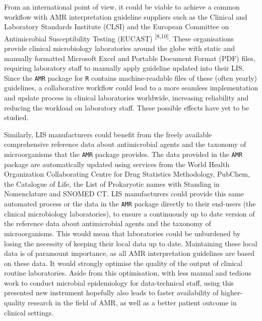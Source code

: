 \documentclass[
]{book}
\begin{document}
From an international point of view, it could be viable to achieve a common workflow with AMR interpretation guideline suppliers such as the Clinical and Laboratory Standards Institute (CLSI) and the European Committee on Antimicrobial Susceptibility Testing (EUCAST) \textsuperscript{{[}8,10{]}}. These organisations provide clinical microbiology laboratories around the globe with static and manually formatted Microsoft Excel and Portable Document Format (PDF) files, requiring laboratory staff to manually apply guideline updated into their LIS. Since the \texttt{AMR} package for \texttt{R} contains machine-readable files of these (often yearly) guidelines, a collaborative workflow could lead to a more seamless implementation and update process in clinical laboratories worldwide, increasing reliability and reducing the workload on laboratory staff. These possible effects have yet to be studied.

Similarly, LIS manufacturers could benefit from the freely available comprehensive reference data about antimicrobial agents and the taxonomy of microorganisms that the \texttt{AMR} package provides. The data provided in the \texttt{AMR} package are automatically updated using services from the World Health Organization Collaborating Centre for Drug Statistics Methodology, PubChem, the Catalogue of Life, the List of Prokaryotic names with Standing in Nomenclature and SNOMED CT. LIS manufacturers could provide this same automated process or the data in the \texttt{AMR} package directly to their end-users (the clinical microbiology laboratories), to ensure a continuously up to date version of the reference data about antimicrobial agents and the taxonomy of microorganisms. This would mean that laboratories could be unburdened by losing the necessity of keeping their local data up to date. Maintaining these local data is of paramount importance, as all AMR interpretation guidelines are based on these data. It would strongly optimise the quality of the output of clinical routine laboratories. Aside from this optimisation, with less manual and tedious work to conduct microbial epidemiology for data-technical staff, using this presented new instrument hopefully also leads to faster availability of higher-quality research in the field of AMR, as well as a better patient outcome in clinical settings.
\end{document}
